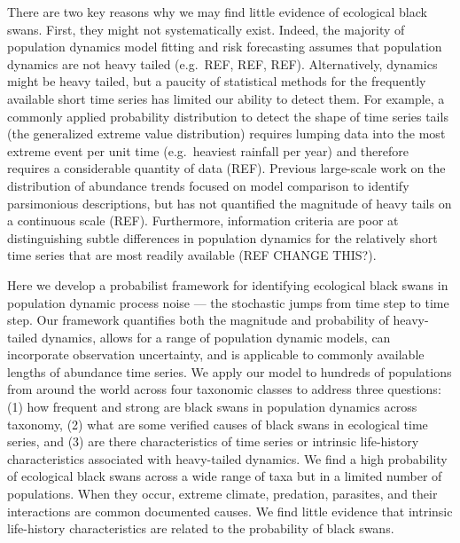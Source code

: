 There are two key reasons why we may find little evidence of ecological black
swans. First, they might not systematically exist. Indeed, the majority of
population dynamics model fitting and risk forecasting assumes that population
dynamics are not heavy tailed (e.g.~REF, REF, REF). Alternatively, dynamics
might be heavy tailed, but a paucity of statistical methods for the frequently
available short time series has limited our ability to detect them. For
example, a commonly applied probability distribution to detect the shape of
time series tails (the generalized extreme value distribution) requires lumping
data into the most extreme event per unit time (e.g.~heaviest rainfall per
year) and therefore requires a considerable quantity of data (REF). Previous
large-scale work on the distribution of abundance trends focused on model
comparison to identify parsimonious descriptions, but has not quantified the
magnitude of heavy tails on a continuous scale (REF). Furthermore, information
criteria are poor at distinguishing subtle differences in population dynamics
for the relatively short time series that are most readily available (REF
CHANGE THIS?).

Here we develop a probabilist framework for identifying ecological black swans
in population dynamic process noise --- the stochastic jumps from time step to
time step. Our framework quantifies both the magnitude and probability of
heavy-tailed dynamics, allows for a range of population dynamic models, can
incorporate observation uncertainty, and is applicable to commonly available
lengths of abundance time series. We apply our model to hundreds of populations
from around the world across four taxonomic classes to address three questions:
(1) how frequent and strong are black swans in population dynamics across
taxonomy, (2) what are some verified causes of black swans in ecological time
series, and (3) are there characteristics of time series or intrinsic
life-history characteristics associated with heavy-tailed dynamics. We find
a high probability of ecological black swans across a wide range of taxa but in
a limited number of populations. When they occur, extreme climate, predation,
parasites, and their interactions are common documented causes. We find little
evidence that intrinsic life-history characteristics are related to the
probability of black swans.

